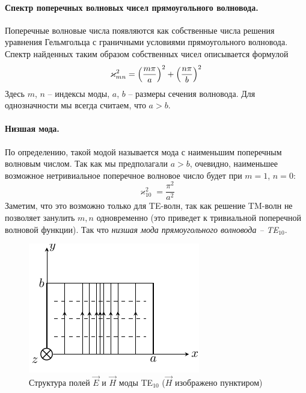 \documentclass[a4paper,14pt]{extarticle}
\begin{document}
	\newpage
	\hypertarget{num4}{}
	






\paragraph{Спектр поперечных волновых чисел прямоугольного волновода. } Поперечные волновые числа появляются как собственные числа решения уравнения Гельмгольца с граничными условиями прямоугольного волновода. Спектр найденных таким образом собственных чисел описывается формулой
\begin{equation}
	\varkappa^2_{mn} = \qty(\frac{m\pi}{a})^2+
		\qty(\frac{n\pi}{b})^2
\end{equation}
Здесь $m$, $n$ -- индексы моды, $a$, $b$ -- размеры сечения волновода. Для однозначности мы всегда считаем, что $a>b$.

\paragraph{Низшая мода.} По определению, такой модой называется мода с наименьшим поперечным волновым числом. Так как мы предполагали $a>b$, очевидно, наименьшее возможное нетривиальное поперечное волновое число будет при $m=1$, $n=0$:
\begin{equation}
	\varkappa^2_{10} = \frac{\pi^2}{a^2}
\end{equation}
Заметим, что это возможно только для TE-волн, так как решение TM-волн не позволяет занулить $m,n$ одновременно (это приведет к тривиальной поперечной волновой функции). Так что \textit{низшая мода прямоугольного волновода -- TE${}_{10}$}.
\begin{figure}[h!]
	\centering
	\includegraphics[scale=1.5]{img/lect4_ris8} 
	\caption{Структура полей $\vec{E}$ и $\vec{H}$ моды TE${}_{10}$ ($\vec{H}$ изображено пунктиром)}
	\label{fig:lect4:8}
\end{figure}
\end{document}
